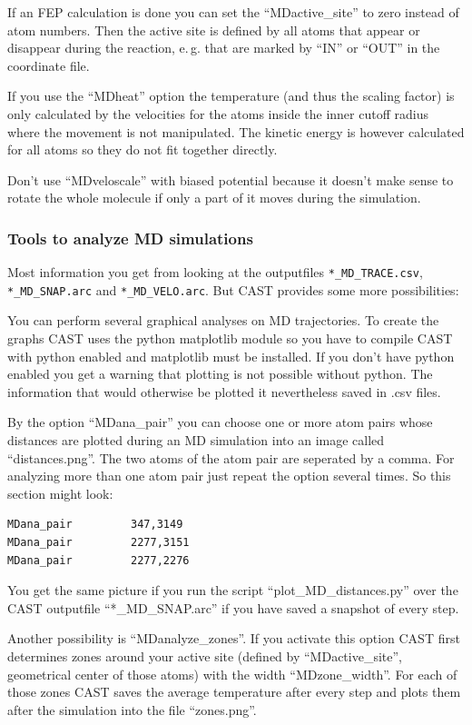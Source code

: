 \documentclass[10pt,a4paper]{article} %
\begin{document}
If an FEP calculation is done you can set the ``MDactive\_site'' to zero instead of atom numbers. Then the active site is defined by all atoms that appear or disappear during the reaction, e.\,g. that are marked by ``IN'' or ``OUT'' in the coordinate file. 
	
If you use the ``MDheat'' option the temperature (and thus the scaling factor) is only calculated by the velocities for the atoms inside the inner cutoff radius where the movement is not manipulated. The kinetic energy is however calculated for all atoms so they do not fit together directly. 

Don't use ``MDveloscale'' with biased potential because it doesn't make sense to rotate the whole molecule if only a part of it moves during the simulation.

\subsubsection{Tools to analyze MD simulations}

Most information you get from looking at the outputfiles \texttt{*\_MD\_TRACE.csv}, \texttt{*\_MD\_SNAP.arc} and \texttt{*\_MD\_VELO.arc}. But CAST provides some more possibilities:

You can perform several graphical analyses on MD trajectories. To create the graphs CAST uses the python matplotlib module so you have to compile CAST with python enabled and matplotlib must be installed. If you don't have python enabled you get a warning that plotting is not possible without python. The information that would otherwise be plotted it nevertheless saved in .csv files.

By the option ``MDana\_pair'' you can choose one or more atom pairs whose distances are plotted during an MD simulation into an image called ``distances.png''. The two atoms of the atom pair are seperated by a comma. For analyzing more than one atom pair just repeat the option several times. So this section might look: 
			\begin{lstlisting}
MDana_pair         347,3149
MDana_pair         2277,3151
MDana_pair         2277,2276
	\end{lstlisting}
	You get the same picture if you run the script ``plot\_MD\_distances.py'' over the CAST outputfile ``*\_MD\_SNAP.arc'' if you have saved a snapshot of every step.

Another possibility is ``MDanalyze\_zones''. If you activate this option CAST first determines zones around your active site (defined by ``MDactive\_site'', geometrical center of those atoms) with the width ``MDzone\_width''. For each of those zones CAST saves the average temperature after every step and plots them after the simulation into the file ``zones.png''. 
\end{document}
